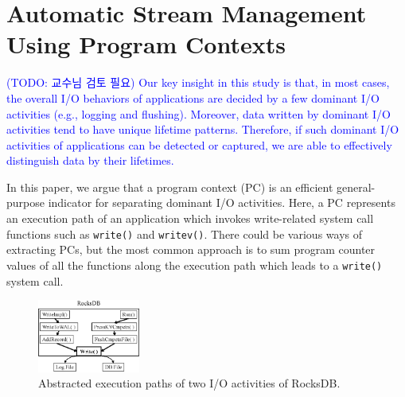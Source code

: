 \section{Automatic Stream Management Using Program Contexts}


{\textcolor{blue}{
(TODO: 교수님 검토 필요)
Our key insight in this study is that, in most cases, the overall I/O behaviors of 
applications are decided by a few dominant
I/O activities (e.g., logging and flushing). Moreover, 
data written by dominant I/O activities tend to have unique lifetime patterns.
Therefore, if such dominant I/O activities of applications can be detected or captured,
we are able to effectively distinguish data by their lifetimes.
}}

In this paper, we argue that a program context (PC) is an efficient
general-purpose indicator for separating dominant I/O activities.  Here, a PC
represents an execution path of an application which invokes write-related
system call functions such as {\tt write()} and {\tt writev()}.  
There could be various ways of extracting PCs, but the most common approach is to
sum program counter values of all the functions along the execution path which
leads to a \texttt{write()} system call.

\begin{figure}[t]
	\centering
	\includegraphics[width=0.3\textwidth]{figure/writepath}
	\caption{Abstracted execution paths of two I/O activities of RocksDB.}
	\label{fig:iopath}
\end{figure}

